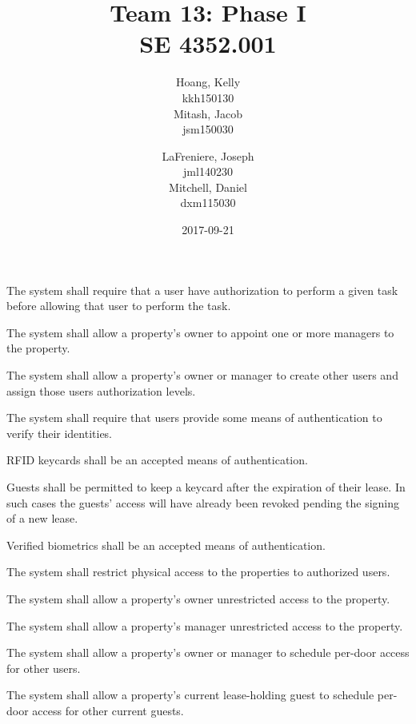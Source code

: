 \documentclass[letter,titlepage,oneside,english]{report}
\title{
  Team 13: Phase I\\
  SE 4352.001
}
\author{%
  Hoang, Kelly\\
  kkh150130\\[3ex]
  Mitash, Jacob\\
  jsm150030
  \and
  LaFreniere, Joseph\\
  jml140230\\[3ex]
  Mitchell, Daniel\\
  dxm115030
}
\date{2017-09-21}
\begin{document}
\maketitle{}

\begin{fr}
\item
  The system shall require that a user have authorization to perform a given task before allowing that user to perform the task.
  \begin{fr}
  \item
    The system shall allow a property's owner to appoint one or more managers to the property.
  \item
    The system shall allow a property's owner or manager to create other users and assign those users authorization levels.
  \item
    The system shall require that users provide some means of authentication to verify their identities.
    \begin{fr}
    \item
      RFID keycards shall be an accepted means of authentication.
      \begin{fr}
      \item
        Guests shall be permitted to keep a keycard after the expiration of their lease.
        In such cases the guests' access will have already been revoked pending the signing of a new lease.
      \end{fr}
    \item
      Verified biometrics shall be an accepted means of authentication.
    \end{fr}
  \end{fr}
\item
  The system shall restrict physical access to the properties to authorized users.
  \begin{fr}
  \item
    The system shall allow a property's owner unrestricted access to the property.
  \item
    The system shall allow a property's manager unrestricted access to the property.
  \item
    The system shall allow a property's owner or manager to schedule per-door access for other users.
  \item
    The system shall allow a property's current lease-holding guest to schedule per-door access for other current guests.
  \end{fr}
\item\label{fr:controls}

\end{fr}
\end{document}
